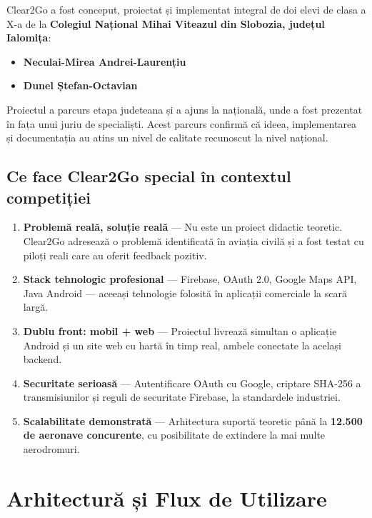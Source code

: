 \documentclass[11pt,a4paper]{report}
\begin{document}
Clear2Go a fost conceput, proiectat și implementat integral de doi elevi de clasa a X-a
de la \textbf{Colegiul Național Mihai Viteazul din Slobozia, județul Ialomița}:

\begin{itemize}
    \item \textbf{Neculai-Mirea Andrei-Laurențiu}
    \item \textbf{Dunel Ștefan-Octavian}
\end{itemize}

Proiectul a parcurs etapa judeteana și a ajuns la {națională}, unde a fost prezentat în fața unui juriu de specialiști. Acest parcurs
confirmă că ideea, implementarea și documentația au atins un nivel de calitate
recunoscut la nivel național.

\section{Ce face Clear2Go special în contextul competiției}

\begin{enumerate}
    \item \textbf{Problemă reală, soluție reală} — Nu este un proiect didactic teoretic.
    Clear2Go adresează o problemă identificată în aviația civilă și a fost testat cu
    piloți reali care au oferit feedback pozitiv.

    \item \textbf{Stack tehnologic profesional} — Firebase, OAuth 2.0, Google Maps API,
    Java Android — aceeași tehnologie folosită în aplicații comerciale la scară largă.

    \item \textbf{Dublu front: mobil + web} — Proiectul livrează simultan o aplicație
    Android și un site web cu hartă în timp real, ambele conectate la același backend.

    \item \textbf{Securitate serioasă} — Autentificare OAuth cu Google, criptare
    SHA-256 a transmisiunilor și reguli de securitate Firebase, la standardele industriei.

    \item \textbf{Scalabilitate demonstrată} — Arhitectura suportă teoretic până la
    \textbf{12.500 de aeronave concurente}, cu posibilitate de extindere la mai multe
    aerodromuri.
\end{enumerate}

\chapter{Arhitectură și Flux de Utilizare}
\end{document}
